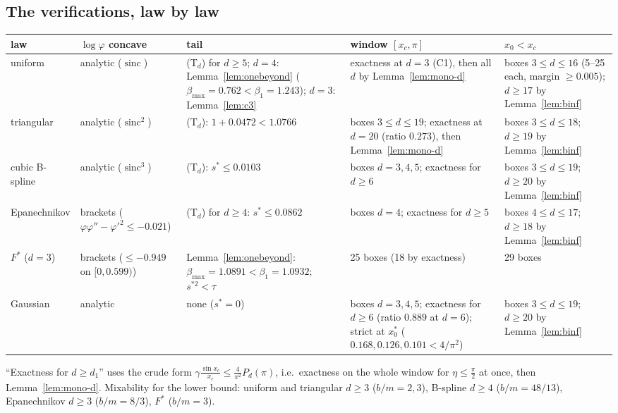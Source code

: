 \documentclass[11pt]{amsart}
\theoremstyle{definition}\newtheorem{definition}[theorem]{Definition}\theoremstyle{remark}\newtheorem{remark}[theorem]{Remark}
\newcommand{\sinc}{\operatorname{sinc}}\newcommand{\E}{\mathbb E}\newcommand{\cx}{\le_{\mathrm{cx}}}
\begin{document}
\subsection{The verifications, law by law}
\begin{center}\footnotesize\setlength{\tabcolsep}{3pt}
\begin{tabular}{p{2.1cm}p{2.3cm}p{2.9cm}p{3.3cm}p{2.6cm}}\toprule
law & $\log\varphi$ concave & tail & window $[x_c,\pi]$ & $x_0<x_c$\\\midrule
uniform & analytic ($\sinc$) & (T$_d$) for $d\ge5$; $d=4$: Lemma~\ref{lem:onebeyond} ($\beta_{\max}=0.762<\beta_1=1.243$); $d=3$: Lemma~\ref{lem:c3} & exactness at $d=3$ (C1), then all $d$ by Lemma~\ref{lem:mono-d} & boxes $3\le d\le16$ (5--25 each, margin $\ge0.005$); $d\ge17$ by Lemma~\ref{lem:binf}\\
triangular & analytic ($\sinc^2$) & (T$_d$): $1+0.0472<1.0766$ & boxes $3\le d\le19$; exactness at $d=20$ (ratio $0.273$), then Lemma~\ref{lem:mono-d} & boxes $3\le d\le18$; $d\ge19$ by Lemma~\ref{lem:binf}\\
cubic B-spline & analytic ($\sinc^3$) & (T$_d$): $s^*\le0.0103$ & boxes $d=3,4,5$; exactness for $d\ge6$ & boxes $3\le d\le19$; $d\ge20$ by Lemma~\ref{lem:binf}\\
Epanechnikov & brackets ($\varphi\varphi''-\varphi'^2\le-0.021$) & (T$_d$) for $d\ge4$: $s^*\le0.0862$ & boxes $d=4$; exactness for $d\ge5$ & boxes $4\le d\le17$; $d\ge18$ by Lemma~\ref{lem:binf}\\
$F^*$ ($d=3$) & brackets ($\le-0.949$ on $[0,0.599)$) & Lemma~\ref{lem:onebeyond}: $\beta_{\max}=1.0891<\beta_1=1.0932$; $s^{*2}<\tau$ & 25 boxes (18 by exactness) & 29 boxes\\
Gaussian & analytic & none ($s^*=0$) & boxes $d=3,4,5$; exactness for $d\ge6$ (ratio $0.889$ at $d=6$); strict at $x_0^*$ ($0.168,0.126,0.101<4/\pi^2$) & boxes $3\le d\le19$; $d\ge20$ by Lemma~\ref{lem:binf}\\\bottomrule
\end{tabular}\end{center}
\noindent ``Exactness for $d\ge d_1$'' uses the crude form $\gamma\frac{\sin x_c}{x_c}\le\frac4{\pi^2}P_d(\pi)$, i.e.\ exactness on the whole window for $\eta\le\frac\pi2$ at once, then Lemma~\ref{lem:mono-d}.
Mixability for the lower bound: uniform and triangular $d\ge3$ ($b/m=2,3$), B-spline $d\ge4$ ($b/m=48/13$), Epanechnikov $d\ge3$ ($b/m=8/3$), $F^*$ ($b/m=3$).
\end{document}
